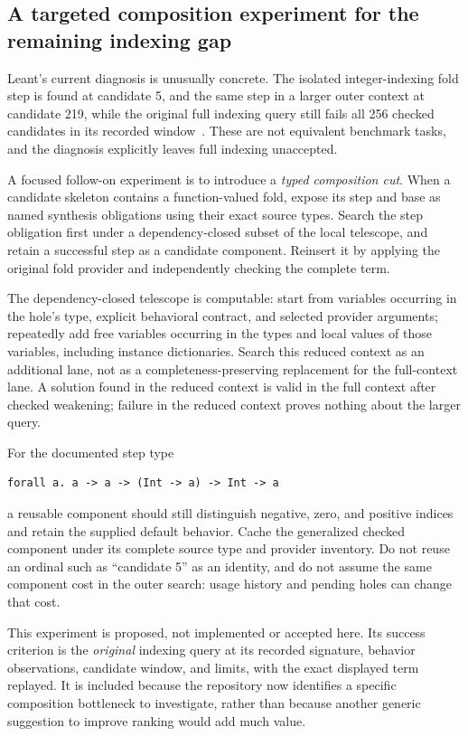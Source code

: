 \subsection{A targeted composition experiment for the remaining indexing gap}

Leant's current diagnosis is unusually concrete. The isolated integer-indexing
fold step is found at candidate 5, and the same step in a larger outer context
at candidate 219, while the original full indexing query still fails all 256
checked candidates in its recorded window~\cite{leant-indexing}. These are not
equivalent benchmark tasks, and the diagnosis explicitly leaves full indexing
unaccepted.

A focused follow-on experiment is to introduce a \emph{typed composition cut}.
When a candidate skeleton contains a function-valued fold, expose its step and
base as named synthesis obligations using their exact source types. Search the
step obligation first under a dependency-closed subset of the local telescope,
and retain a successful step as a candidate component. Reinsert it by applying
the original fold provider and independently checking the complete term.

The dependency-closed telescope is computable: start from variables occurring
in the hole's type, explicit behavioral contract, and selected provider
arguments; repeatedly add free variables occurring in the types and local
values of those variables, including instance dictionaries. Search this reduced
context as an additional lane, not as a completeness-preserving replacement for
the full-context lane. A solution found in the reduced context is valid in the
full context after checked weakening; failure in the reduced context proves
nothing about the larger query.

For the documented step type
\par\noindent\begin{minipage}{\linewidth}
\begin{lstlisting}
forall a. a -> a -> (Int -> a) -> Int -> a
\end{lstlisting}
\end{minipage}\par
a reusable component should still distinguish negative, zero, and positive
indices and retain the supplied default behavior. Cache the generalized checked
component under its complete source type and provider inventory. Do not reuse
an ordinal such as ``candidate 5'' as an identity, and do not assume the same
component cost in the outer search: usage history and pending holes can change
that cost.

This experiment is proposed, not implemented or accepted here. Its success
criterion is the \emph{original} indexing query at its recorded signature,
behavior observations, candidate window, and limits, with the exact displayed
term replayed. It is included because the repository now identifies a specific
composition bottleneck to investigate, rather than because another generic
suggestion to improve ranking would add much value.
